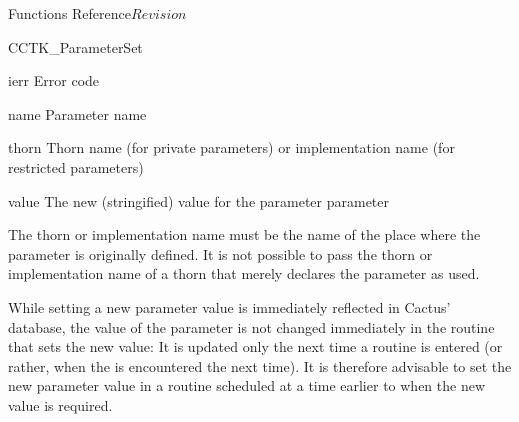 \begin{cactuspart}{ Functions Reference}{}{$Revision$}
\begin{FunctionDescription}{CCTK\_ParameterSet}
\begin{ResultSection}
\begin{Result}{ierr}
Error code
\end{Result}
\end{ResultSection}

\begin{ParameterSection}
\begin{Parameter}{name}
Parameter name
\end{Parameter}
\begin{Parameter}{thorn}
Thorn name (for private parameters) or implementation name (for restricted parameters)
\end{Parameter}
\begin{Parameter}{value}
The new (stringified) value for the parameter parameter
\end{Parameter}
\end{ParameterSection}

\begin{Discussion}
The thorn or implementation name must be the name of the place where
the parameter is originally defined.  It is not possible to pass the
thorn or implementation name of a thorn that merely declares the
parameter as used.

While setting a new parameter value is immediately reflected in
Cactus' database, the value of the parameter is not changed
immediately in the routine that sets the new value: It is updated only
the next time a routine is entered (or rather, when the
 is encountered the next time). It is
therefore advisable to set the new parameter value in a routine
scheduled at a time earlier to when the new value is required.
\end{Discussion}


\end{FunctionDescription}
\end{cactuspart}
